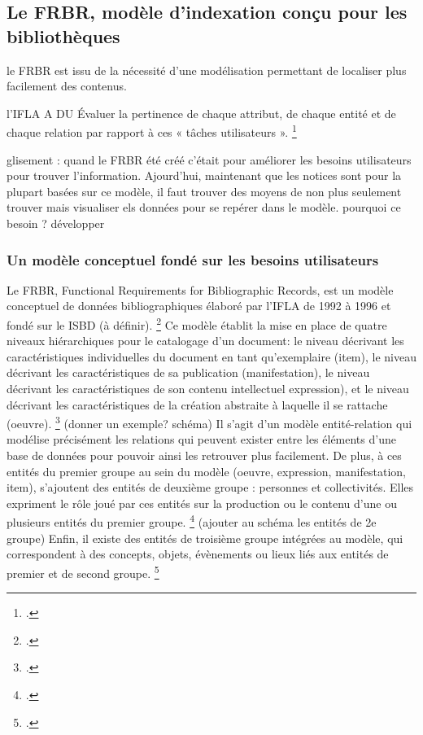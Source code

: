 \subsection{Le FRBR, modèle d'indexation conçu pour les bibliothèques}

le FRBR est issu de la nécessité d'une modélisation permettant de localiser plus facilement des contenus. 

l'IFLA A DU Évaluer la pertinence de chaque attribut, de chaque entité et de chaque relation par rapport à ces
« tâches utilisateurs ». \footcite{zotero-item-684}

glisement : quand le FRBR  été créé c'était pour améliorer les besoins utilisateurs pour trouver l'information.
Ajourd'hui, maintenant que les notices sont pour la plupart basées sur ce modèle, il faut trouver des moyens de non plus seulement trouver mais visualiser els données pour se repérer dans le modèle. pourquoi ce besoin ? développer 

\subsubsection{Un modèle conceptuel fondé sur les besoins utilisateurs}
Le FRBR, Functional Requirements for Bibliographic Records, est un modèle conceptuel de données bibliographiques élaboré par l'IFLA de 1992 à 1996 et fondé sur le ISBD (à définir). \footcite{zotero-item-651} Ce modèle établit la mise en place de quatre niveaux hiérarchiques pour le catalogage d'un document: le niveau décrivant les caractéristiques individuelles du document en tant qu'exemplaire (item), le niveau décrivant les caractéristiques de sa publication (manifestation), le niveau décrivant les caractéristiques de son contenu intellectuel expression), et le niveau décrivant les caractéristiques de la création abstraite à laquelle il se rattache (oeuvre). \footcite{zotero-item-651} (donner un exemple? schéma) 
Il s'agit d'un modèle entité-relation qui modélise précisément les relations qui peuvent exister entre les éléments d'une base de données pour pouvoir ainsi les retrouver plus facilement.
De plus, à ces entités du premier groupe au sein du modèle (oeuvre, expression, manifestation, item), s'ajoutent des entités de deuxième groupe : personnes et collectivités. Elles expriment le rôle joué par ces entités sur la production ou le contenu d'une ou plusieurs entités du premier groupe. \footcite{zotero-item-657} (ajouter au schéma les entités de 2e groupe) 
Enfin, il existe des entités de troisième groupe intégrées au modèle, qui correspondent à des concepts, objets, évènements ou lieux liés aux entités de premier et de second groupe. \footcite{zotero-item-657}


